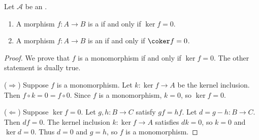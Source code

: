 \begin{lemma} \label{lemma:monomorphism_epimorphism_in_abelian_category_is_equivalent_to_map_with_zero_kernel_cokernel}
Let $\mathcal{A}$ be an .
\begin{enumerate}
\item A morphism $f\colon A\to B$ is a  if and only if $\ker f=0$.
\item A morphism $f\colon A\to B$ is an  if and only if $\coker f=0$.
\end{enumerate}
\end{lemma}
\begin{proof}
    We prove that $f$ is a monomorphism if and only if $\ker f=0$. The other statement is dually true.

    ($\Rightarrow$) Suppose $f$ is a monomorphism. Let $k\colon\ker f\to A$ be the kernel inclusion. Then $f \circ k=0 = f \circ 0$. Since $f$ is a monomorphism, $k=0$, so $\ker f=0$.

    ($\Leftarrow$) Suppose $\ker f=0$. Let $g,h\colon B\to C$ satisfy $gf=hf$. Let $d=g-h\colon B\to C$. Then $df=0$. The kernel inclusion $k\colon\ker f\to A$ satisfies $dk=0$, so $k=0$ and $\ker d=0$. Thus $d=0$ and $g=h$, so $f$ is a monomorphism. 
\end{proof}
